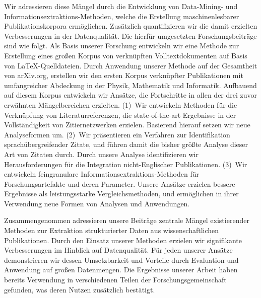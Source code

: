 Wir adressieren diese Mängel durch die Entwicklung von Data-Mining- und In\-for\-ma\-tions\-ex\-trak\-tions-Methoden, welche die Erstellung maschinenlesbarer Publikationskorpora ermöglichen. Zusätzlich quantifizieren wir die damit erzielten Verbesserungen in der Datenqualität.
Die hierfür umgesetzten Forschungsbeiträge sind wie folgt.
Als Basis unserer Forschung entwickeln wir eine Methode zur Erstellung eines großen Korpus von verknüpften Volltextdokumenten auf Basis von \LaTeX{}-Quelldateien.
Durch Anwendung unserer Methode auf der Gesamtheit von arXiv.org, erstellen wir den ersten Korpus verknüpfter Publikationen mit umfangreicher Abdeckung in der Physik, Mathematik und Informatik.
Aufbauend auf diesem Korpus entwickeln wir Ansätze, die Fortschritte in allen der drei zuvor erwähnten Mängelbereichen erzielten.
(1)~Wir entwickeln Methoden für die Verknüpfung von Literaturreferenzen, die state-of-the-art Ergebnisse in der Vollständigkeit von Zitiernetzwerken erzielen.
Basierend hierauf setzen wir neue Analyseformen um.
(2)~Wir präsentieren ein Verfahren zur Identifikation sprachübergreifender Zitate, und führen damit die bisher größte Analyse dieser Art von Zitaten durch.
Durch unsere Analyse identifizieren wir Herausforderungen für die Integration nicht-Englischer Publikationen.
(3)~Wir entwickeln feingranulare In\-for\-ma\-tions\-ex\-trak\-tions-Methoden für Forschungsartefakte und deren Parameter. Unsere Ansätze erzielen bessere Ergebnisse als leistungsstarke Vergleichsmethoden, und ermöglichen in ihrer Verwendung neue Formen von Analysen und Anwendungen.

Zusammengenommen adressieren unsere Beiträge zentrale Mängel existierender Methoden zur Extraktion strukturierter Daten aus wissenschaftlichen Publikationen.
Durch den Einsatz unserer Methoden erzielen wir signifikante Verbesserungen im Hinblick auf Datenqualität.
Für jeden unserer Ansätze demonstrieren wir dessen Umsetzbarkeit und Vorteile durch Evaluation und Anwendung auf großen Datenmengen.
Die Ergebnisse unserer Arbeit haben bereits Verwendung in verschiedenen Teilen der Forschungsgemeinschaft gefunden, was deren Nutzen zusätzlich bestätigt.

